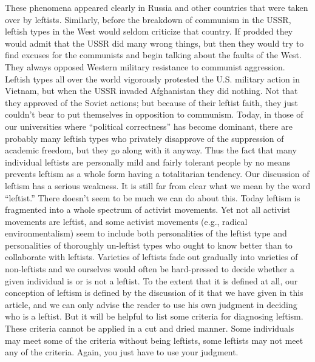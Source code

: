  These phenomena appeared clearly in Russia and other countries that were taken over by leftists. Similarly, before the breakdown of communism in the USSR, leftish types in the West would seldom criticize that country. If prodded they would admit that the USSR did many wrong things, but then they would try to find excuses for the communists and begin talking about the faults of the West. They always opposed Western military resistance to communist aggression. Leftish types all over the world vigorously protested the U.S. military action in Vietnam, but when the USSR invaded Afghanistan they did nothing. Not that they approved of the Soviet actions; but because of their leftist faith, they just couldn’t bear to put themselves in opposition to communism. Today, in those of our universities where “political correctness” has become dominant, there are probably many leftish types who privately disapprove of the suppression of academic freedom, but they go along with it anyway.
 Thus the fact that many individual leftists are personally mild and fairly tolerant people by no means prevents leftism as a whole form having a totalitarian tendency.
 Our discussion of leftism has a serious weakness. It is still far from clear what we mean by the word “leftist.” There doesn’t seem to be much we can do about this. Today leftism is fragmented into a whole spectrum of activist movements. Yet not all activist movements are leftist, and some activist movements (e.g., radical environmentalism) seem to include both personalities of the leftist type and personalities of thoroughly un-leftist types who ought to know better than to collaborate with leftists. Varieties of leftists fade out gradually into varieties of non-leftists and we ourselves would often be hard-pressed to decide whether a given individual is or is not a leftist. To the extent that it is defined at all, our conception of leftism is defined by the discussion of it that we have given in this article, and we can only advise the reader to use his own judgment in deciding who is a leftist.\break
{} But it will be helpful to list some criteria for diagnosing leftism. These criteria cannot be applied in a cut and dried manner. Some individuals may meet some of the criteria without being leftists, some leftists may not meet any of the criteria. Again, you just have to use your judgment.
